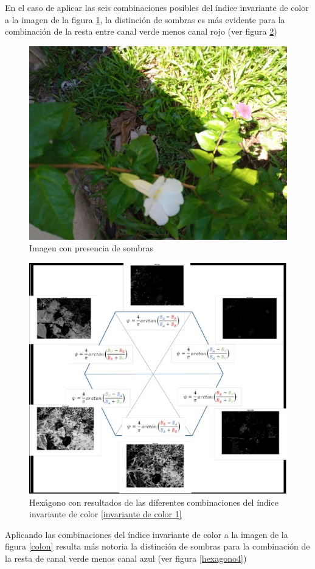 En el caso de aplicar las seis combinaciones posibles del índice invariante de color a la imagen de la figura \ref{planta}, la distinción de sombras es más evidente para la combinación de la resta entre canal verde menos canal rojo (ver figura \ref{hexagono3})

\begin{figure}[H]
    \centering
    \includegraphics[width=0.5\linewidth]{Imagenes//Informes/info3_planta.JPG}
    \caption{Imagen con presencia de sombras}
    \label{planta}
\end{figure}

\begin{figure}[H]
    \centering
    \includegraphics[width=0.5\linewidth]{Imagenes//Informes/info3_hexagono3.JPG}
    \caption{Hexágono con resultados de las diferentes combinaciones del índice invariante de color \ref{invariante de color 1}}
    \label{hexagono3}
\end{figure}

Aplicando las combinaciones del índice invariante de color a la imagen de la figura \ref{colon} resulta más notoria la distinción de sombras para la combinación de la resta de canal verde menos canal azul (ver figura \ref{hexagono4}) 

